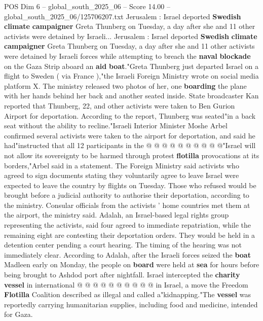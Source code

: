 \begin{textsample}{POS Dim 6 – global\_south\_2025\_06 – Score 14.00 – global\_south\_2025\_06/125706207.txt}  \label{ex:f6_pos_017}
Jerusalem : Israel deported \textbf{Swedish} \textbf{climate} \textbf{campaigner} Greta Thunberg on Tuesday, a day after she and 11 other activists were detained by Israeli...
Jerusalem : Israel deported \textbf{Swedish} \textbf{climate} \textbf{campaigner} Greta Thunberg on Tuesday, a day after she and 11 other activists were detained by Israeli forces while attempting to breach the \textbf{naval} \textbf{blockade} on the Gaza Strip aboard an \textbf{aid} \textbf{boat}."Greta Thunberg just departed Israel on a flight to Sweden ( via France ),"the Israeli Foreign Ministry wrote on social media platform X.
The ministry released two photos of her, one \textbf{boarding} the plane with her hands behind her back and another seated inside.
State broadcaster Kan reported that Thunberg, 22, and other activists were taken to Ben Gurion Airport for deportation.
According to the report, Thunberg was seated"in a back seat without the ability to recline."Israeli Interior Minister Moshe Arbel confirmed several activists were taken to the airport for deportation, and said he had"instructed that all 12 participants in the @ @ @ @ @ @ @ @ @ @"Israel will not allow its sovereignty to be harmed through protest \textbf{flotilla} provocations at its borders,"Arbel said in a statement.
The Foreign Ministry said activists who agreed to sign documents stating they voluntarily agree to leave Israel were expected to leave the country by flights on Tuesday.
Those who refused would be brought before a judicial authority to authorise their deportation, according to the ministry.
Consular officials from the activists ' home countries met them at the airport, the ministry said.
Adalah, an Israel-based legal rights group representing the activists, said four agreed to immediate repatriation, while the remaining eight are contesting their deportation orders.
They would be held in a detention center pending a court hearing.
The timing of the hearing was not immediately clear.
According to Adalah, after the Israeli forces seized the \textbf{boat} Madleen early on Monday, the people on \textbf{board} were held at \textbf{sea} for hours before being brought to Ashdod port after nightfall.
Israel intercepted the \textbf{charity} \textbf{vessel} in international @ @ @ @ @ @ @ @ @ @ in Israel, a move the Freedom \textbf{Flotilla} Coalition described as illegal and called a"kidnapping."The \textbf{vessel} was reportedly carrying humanitarian supplies, including food and medicine, intended for Gaza.

\end{textsample}
